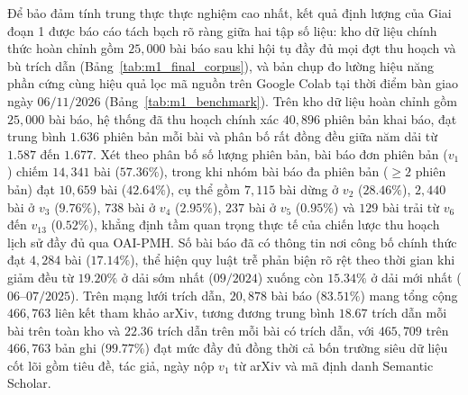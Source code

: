 Để bảo đảm tính trung thực thực nghiệm cao nhất, kết quả định lượng của Giai đoạn 1 được báo cáo tách bạch rõ ràng giữa hai tập số liệu: kho dữ liệu chính thức hoàn chỉnh gồm $25{,}000$ bài báo sau khi hội tụ đầy đủ mọi đợt thu hoạch và bù trích dẫn (Bảng~\ref{tab:m1_final_corpus}), và bản chụp đo lường hiệu năng phần cứng cùng hiệu quả lọc mã nguồn trên Google Colab tại thời điểm bàn giao ngày $06/11/2026$ (Bảng~\ref{tab:m1_benchmark}). Trên kho dữ liệu hoàn chỉnh gồm $25{,}000$ bài báo, hệ thống đã thu hoạch chính xác $40{,}896$ phiên bản khai báo, đạt trung bình $1.636$ phiên bản mỗi bài và phân bố rất đồng đều giữa năm dải từ $1.587$ đến $1.677$. Xét theo phân bố số lượng phiên bản, bài báo đơn phiên bản ($v_1$) chiếm $14{,}341$ bài ($57.36\%$), trong khi nhóm bài báo đa phiên bản ($\ge 2$ phiên bản) đạt $10{,}659$ bài ($42.64\%$), cụ thể gồm $7{,}115$ bài dừng ở $v_2$ ($28.46\%$), $2{,}440$ bài ở $v_3$ ($9.76\%$), $738$ bài ở $v_4$ ($2.95\%$), $237$ bài ở $v_5$ ($0.95\%$) và $129$ bài trải từ $v_6$ đến $v_{13}$ ($0.52\%$), khẳng định tầm quan trọng thực tế của chiến lược thu hoạch lịch sử đầy đủ qua OAI-PMH. Số bài báo đã có thông tin nơi công bố chính thức đạt $4{,}284$ bài ($17.14\%$), thể hiện quy luật trễ phản biện rõ rệt theo thời gian khi giảm đều từ $19.20\%$ ở dải sớm nhất ($09/2024$) xuống còn $15.34\%$ ở dải mới nhất ($06\text{--}07/2025$). Trên mạng lưới trích dẫn, $20{,}878$ bài báo ($83.51\%$) mang tổng cộng $466{,}763$ liên kết tham khảo arXiv, tương đương trung bình $18.67$ trích dẫn mỗi bài trên toàn kho và $22.36$ trích dẫn trên mỗi bài có trích dẫn, với $465{,}709$ trên $466{,}763$ bản ghi ($99.77\%$) đạt mức đầy đủ đồng thời cả bốn trường siêu dữ liệu cốt lõi gồm tiêu đề, tác giả, ngày nộp $v_1$ từ arXiv và mã định danh Semantic Scholar.


